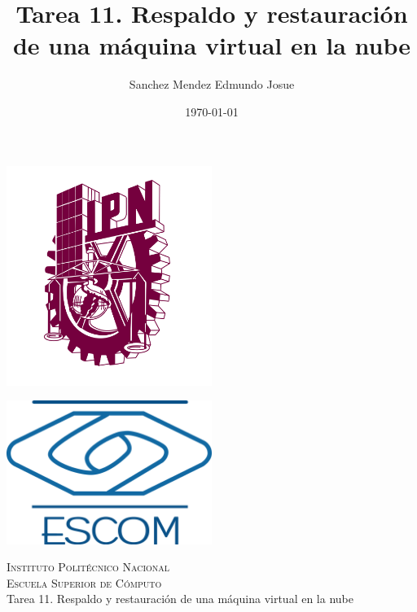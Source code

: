 \documentclass[11pt]{article}
\date{\today}
\title{Tarea 11. Respaldo y restauración de una máquina virtual en la nube}
\author{Sanchez Mendez Edmundo Josue}
\begin{document}
		\begin{titlepage}
			\begin{center}
				
				
				\noindent
				\begin{minipage}{0.5\textwidth}
					\begin{flushleft} \large
						\includegraphics[width=0.5\textwidth]{resources/ipn.png}
					\end{flushleft}
				\end{minipage}%
				\begin{minipage}{0.55\textwidth}
					\begin{flushright} \large
						\includegraphics[width=0.5\textwidth]{resources/escom.png}
					\end{flushright}
				\end{minipage}
				
				\textsc{\LARGE Instituto Politécnico Nacional}\\[0.5cm]
				
				\textsc{\Large Escuela Superior de Cómputo}\\[1cm]
				
				
				{ \huge Tarea 11. Respaldo y restauración de una máquina virtual en la nube \\[1cm] }
				

\end{center}
\end{titlepage}
\end{document}

